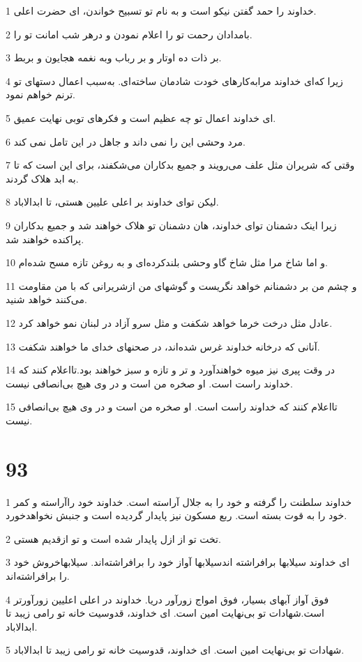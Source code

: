 \par 1 خداوند را حمد گفتن نیکو است و به نام تو تسبیح خواندن، ای حضرت اعلی.
\par 2 بامدادان رحمت تو را اعلام نمودن و درهر شب امانت تو را.
\par 3 بر ذات ده اوتار و بر رباب وبه نغمه هجایون و بربط.
\par 4 زیرا که‌ای خداوند مرابه‌کارهای خودت شادمان ساخته‌ای. به‌سبب اعمال دستهای تو ترنم خواهم نمود.
\par 5 ‌ای خداوند اعمال تو چه عظیم است و فکرهای توبی نهایت عمیق.
\par 6 مرد وحشی این را نمی داند و جاهل در این تامل نمی کند.
\par 7 وقتی که شریران مثل علف می‌رویند و جمیع بدکاران می‌شکفند، برای این است که تا به ابد هلاک گردند.
\par 8 لیکن توای خداوند بر اعلی علیین هستی، تا ابدالاباد.
\par 9 زیرا اینک دشمنان تو‌ای خداوند، هان دشمنان تو هلاک خواهند شد و جمیع بدکاران پراکنده خواهند شد.
\par 10 و اما شاخ مرا مثل شاخ گاو وحشی بلندکرده‌ای و به روغن تازه مسح شده‌ام.
\par 11 و چشم من بر دشمنانم خواهد نگریست و گوشهای من ازشریرانی که با من مقاومت می‌کنند خواهد شنید.
\par 12 عادل مثل درخت خرما خواهد شکفت و مثل سرو آزاد در لبنان نمو خواهد کرد.
\par 13 آنانی که درخانه خداوند غرس شده‌اند، در صحنهای خدای ما خواهند شکفت.
\par 14 در وقت پیری نیز میوه خواهند‌آورد و تر و تازه و سبز خواهند بود.تااعلام کنند که خداوند راست است. او صخره من است و در وی هیچ بی‌انصافی نیست.
\par 15 تااعلام کنند که خداوند راست است. او صخره من است و در وی هیچ بی‌انصافی نیست.
 
\chapter{93}

\par 1 خداوند سلطنت را گرفته و خود را به جلال آراسته است. خداوند خود راآراسته و کمر خود را به قوت بسته است. ربع مسکون نیز پایدار گردیده است و جنبش نخواهدخورد.
\par 2 تخت تو از ازل پایدار شده است و تو ازقدیم هستی.
\par 3 ‌ای خداوند سیلابها برافراشته اندسیلابها آواز خود را برافراشته‌اند. سیلابهاخروش خود را برافراشته‌اند.
\par 4 فوق آواز آبهای بسیار، فوق امواج زورآور دریا. خداوند در اعلی اعلیین زورآورتر است.شهادات تو بی‌نهایت امین است. ای خداوند، قدوسیت خانه تو رامی زیبد تا ابدالاباد.
\par 5 شهادات تو بی‌نهایت امین است. ای خداوند، قدوسیت خانه تو رامی زیبد تا ابدالاباد.
 
